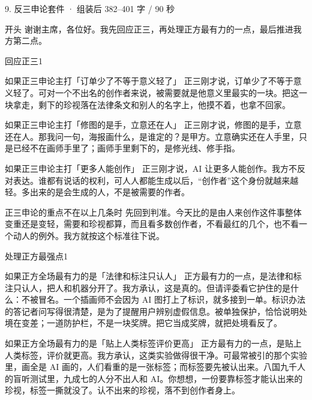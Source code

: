 \documentclass[script,con]{debate}
\begin{document}
\begin{kit}{9. 反三申论}{套件 · 组装后 382–401 字 / 90 秒}
\begin{fixed}{开头}
谢谢主席，各位好。我先回应正三，再处理正方最有力的一点，最后推进我方第二点。
\end{fixed}
\begin{pick}{回应正三}{1}
\begin{module}{如果正三申论主打「订单少了不等于意义轻了」}
正三刚才说，订单少了不等于意义轻了。可对一个不出名的创作者来说，被需要就是他意义里最实的一块。把这一块拿走，剩下的珍视落在法律条文和别人的名字上，他摸不着，也拿不回家。
\end{module}
\begin{module}{如果正三申论主打「修图的是手，立意还在人」}
正三刚才说，修图的是手，立意还在人。那我问一句，海报画什么，是谁定的？是甲方。立意确实还在人手里，只是已经不在画师手里了；画师手里剩下的，是修光线、修手指。
\end{module}
\begin{module}{如果正三申论主打「更多人能创作」}
正三刚才说，AI 让更多人能创作。我方不反对表达。谁都有说话的权利，可人人都能生成以后，“创作者”这个身份就越来越轻。多出来的是会生成的人，不是被需要的作者。
\end{module}
\begin{fallback}{正三申论的重点不在以上几条时}
先回到判准。今天比的是由人来创作这件事整体变重还是变轻，需要和珍视都算，而且看多数创作者，不看最红的几个，也不看一个动人的例外。我方就按这个标准往下说。
\end{fallback}
\end{pick}
\begin{pick}{处理正方最强点}{1}
\begin{module}{如果正方全场最有力的是「法律和标注只认人」}
正方最有力的一点，是法律和标注只认人，把人和机器分开了。我方承认，这是真的。但请评委看它护住的是什么：不被冒名。一个插画师不会因为 AI 图打上了标识，就多接到一单。标识办法的答记者问写得很清楚，是为了提醒用户辨别虚假信息。被单独保护，恰恰说明处境在变差；一道防护栏，不是一块奖牌。把它当成奖牌，就把处境看反了。
\end{module}
\begin{module}{如果正方全场最有力的是「贴上人类标签评价更高」}
正方最有力的一点，是贴上人类标签，评价就更高。我方承认，这类实验做得很干净。可最常被引的那个实验里，画全是 AI 画的，人们看重的是一张标签；而标签要先被认出来。八国九千人的盲听测试里，九成七的人分不出人和 AI。你想想，一份要靠标签才能认出来的珍视，标签一撕就没了。认不出来的珍视，落不到创作者身上。

\end{module}
\end{pick}
\end{kit}
\end{document}
